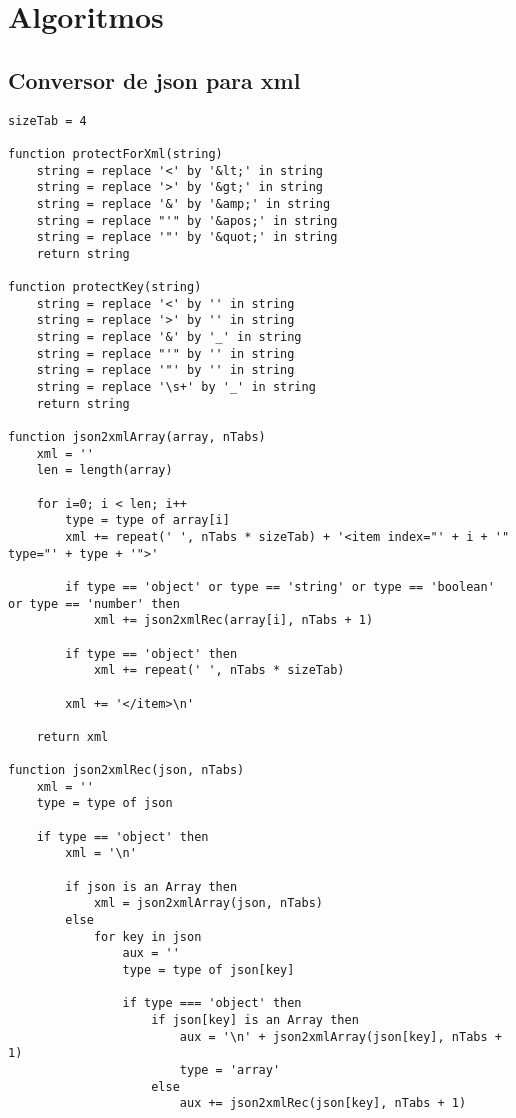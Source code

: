 \chapter{Algoritmos}

\section{Conversor de \acrshort{json} para \acrshort{xml}}\label{exem:convXML}
\begin{lstlisting}[language=pseudocode, caption=Algoritmo de conversão de \acrshort{json} para \acrshort{xml}]
sizeTab = 4

function protectForXml(string)
    string = replace '<' by '&lt;' in string
    string = replace '>' by '&gt;' in string
    string = replace '&' by '&amp;' in string
    string = replace "'" by '&apos;' in string
    string = replace '"' by '&quot;' in string
    return string

function protectKey(string)
    string = replace '<' by '' in string
    string = replace '>' by '' in string
    string = replace '&' by '_' in string
    string = replace "'" by '' in string
    string = replace '"' by '' in string
    string = replace '\s+' by '_' in string
    return string

function json2xmlArray(array, nTabs)
    xml = ''
    len = length(array)

    for i=0; i < len; i++
        type = type of array[i]
        xml += repeat(' ', nTabs * sizeTab) + '<item index="' + i + '" type="' + type + '">' 

        if type == 'object' or type == 'string' or type == 'boolean' or type == 'number' then
            xml += json2xmlRec(array[i], nTabs + 1)

        if type == 'object' then
            xml += repeat(' ', nTabs * sizeTab)

        xml += '</item>\n'

    return xml

function json2xmlRec(json, nTabs)
    xml = ''
    type = type of json
    
    if type == 'object' then
        xml = '\n'

        if json is an Array then
            xml = json2xmlArray(json, nTabs)
        else
            for key in json
                aux = ''
                type = type of json[key]

                if type === 'object' then
                    if json[key] is an Array then
                        aux = '\n' + json2xmlArray(json[key], nTabs + 1)
                        type = 'array'
                    else
                        aux += json2xmlRec(json[key], nTabs + 1)
                    

\end{lstlisting}
